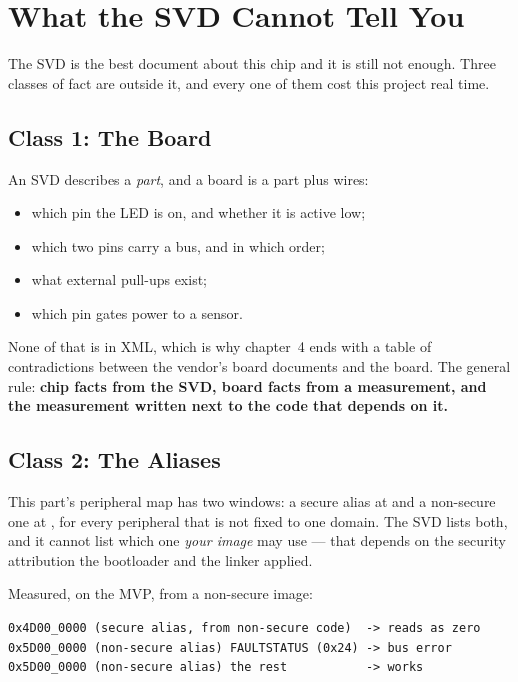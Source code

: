 \section{What the SVD Cannot Tell You}
\label{sec:svd-limits}

The SVD is the best document about this chip and it is still not enough. Three classes of fact are
outside it, and every one of them cost this project real time.

\subsection{Class 1: The Board}

An SVD describes a \emph{part}, and a board is a part plus wires:

\begin{itemize}
    \item which pin the LED is on, and whether it is active low;
    \item which two pins carry a bus, and in which order;
    \item what external pull-ups exist;
    \item which pin gates power to a sensor.
\end{itemize}

None of that is in XML, which is why chapter~4 ends with a table of contradictions between the
vendor's board documents and the board. The general rule: \textbf{chip facts from the SVD, board
facts from a measurement, and the measurement written next to the code that depends on it.}

\subsection{Class 2: The Aliases}

This part's peripheral map has two windows: a secure alias at  and a
non-secure one at , for every peripheral that is not fixed to one domain.
The SVD lists both, and it cannot list which one \emph{your image} may use — that depends on the
security attribution the bootloader and the linker applied.

Measured, on the MVP, from a non-secure image:

\begin{verbatim}
0x4D00_0000 (secure alias, from non-secure code)  -> reads as zero
0x5D00_0000 (non-secure alias) FAULTSTATUS (0x24) -> bus error
0x5D00_0000 (non-secure alias) the rest           -> works
\end{verbatim}

